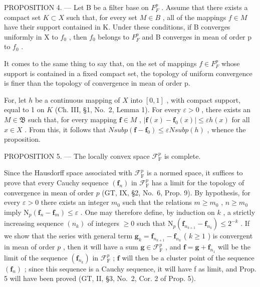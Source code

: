PROPOSITION 4. --- Let B be a filter base on \(F_{F}^{p}\) . Assume that there exists a compact set \(K \subset X\) such that, for every set \(M \in B\) , all of the mappings \(f \in M\) have their support contained in K. Under these conditions, if B converges uniformly in X to \(f_{0}\) , then \(f_{0}\) belongs to \(F_{F}^{p}\) and B converges in mean of order p to \(f_{0}\) .

It comes to the same thing to say that, on the set of mappings \(f \in F_{F}^{p}\) whose support is contained in a fixed compact set, the topology of uniform convergence is finer than the topology of convergence in mean of order p.

For, let \(h\) be a continuous mapping of \(X\) into \([0,1]\) , with compact support, equal to 1 on \(K\) (Ch. III, §1, No.~2, Lemma 1). For every \(\varepsilon > 0\) , there exists an \(M \in \mathfrak{B}\) such that, for every mapping \(\mathbf{f} \in M\) , \(|\mathbf{f}(x) - \mathbf{f}_0(x)| \leqslant \varepsilon h(x)\) for all \(x \in X\) . From this, it follows that \(N sub p(\mathbf{f} - \mathbf{f}_0) \leqslant \varepsilon N sub p(h)\) , whence the proposition.

PROPOSITION 5. --- The locally convex space \(\mathcal{F}_{\mathrm{F}}^{p}\) is complete.

Since the Hausdorff space associated with \(\mathcal{F}_{\mathrm{F}}^{p}\) is a normed space, it suffices to prove that every Cauchy sequence \((\mathbf{f}_n)\) in \(\mathcal{F}_{\mathrm{F}}^{p}\) has a limit for the topology of convergence in mean of order \(p\) (GT, IX, §2, No.~6, Prop. 9). By hypothesis, for every \(\varepsilon > 0\) there exists an integer \(m_0\) such that the relations \(m \geqslant m_0\) , \(n \geqslant m_0\) imply \(\mathrm{N}_p(\mathbf{f}_n - \mathbf{f}_m) \leqslant \varepsilon\) . One may therefore define, by induction on \(k\) , a strictly increasing sequence \((n_k)\) of integers \(\geqslant 0\) such that \(\mathrm{N}_p(\mathbf{f}_{n_{k+1}} - \mathbf{f}_{n_k}) \leqslant 2^{-k}\) . If we show that the series with general term \(\mathbf{g}_k = \mathbf{f}_{n_{k+1}} - \mathbf{f}_{n_k}\) ( \(k \geqslant 1\) ) is convergent in mean of order \(p\) , then it will have a sum \(\mathbf{g} \in \mathcal{F}_{\mathrm{F}}^p\) , and \(\mathbf{f} = \mathbf{g} + \mathbf{f}_{n_1}\) will be the limit of the sequence \((\mathbf{f}_{n_k})\) in \(\mathcal{F}_{\mathrm{F}}^p\) ; \(\mathbf{f}\) will then be a cluster point of the sequence \((\mathbf{f}_n)\) ; since this sequence is a Cauchy sequence, it will have f as limit, and Prop. 5 will have been proved (GT, II, §3, No.~2, Cor. 2 of Prop. 5).

